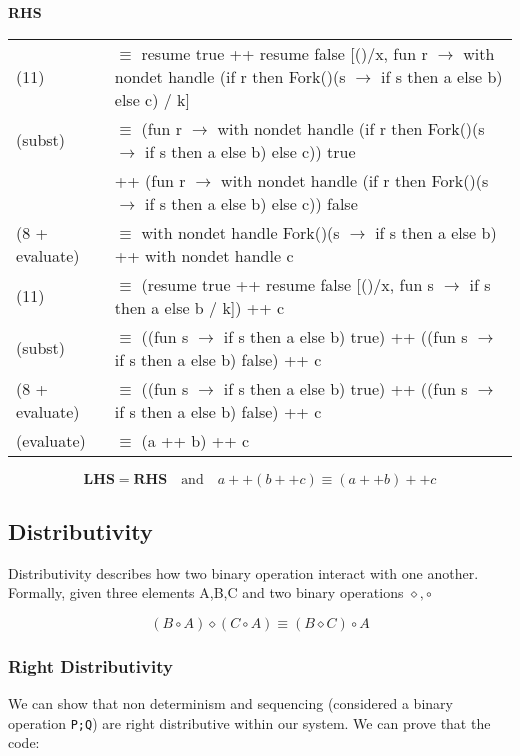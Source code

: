 \documentclass[logo,bsc,singlespacing,parskip]{infthesis}
\begin{document}
\noindent\textbf{RHS}

\begin{flushleft}
\renewcommand{\arraystretch}{1.3} %
\begin{tabularx}{\textwidth}{l X}
    (11) & $\equiv$ resume true ++ resume false [()/x, fun r $\rightarrow$ with nondet handle (if r then Fork()(s $\rightarrow$ if s then a else b) else c) / k] \\
    (subst) & $\equiv$ (fun r $\rightarrow$ with nondet handle (if r then Fork()(s $\rightarrow$ if s then a else b) else c)) true \\
            & \quad ++ (fun r $\rightarrow$ with nondet handle (if r then Fork()(s $\rightarrow$ if s then a else b) else c)) false \\
    (8 + evaluate) & $\equiv$ with nondet handle Fork()(s $\rightarrow$ if s then a else b) ++ with nondet handle c \\
    (11) & $\equiv$ (resume true ++ resume false [()/x, fun s $\rightarrow$ if s then a else b / k]) ++ c \\
    (subst) & $\equiv$ ((fun s $\rightarrow$ if s then a else b) true) ++ ((fun s $\rightarrow$ if s then a else b) false) ++ c \\
    (8 + evaluate) & $\equiv$ ((fun s $\rightarrow$ if s then a else b) true) ++ ((fun s $\rightarrow$ if s then a else b) false) ++ c \\
    (evaluate) & $\equiv$ (a ++ b) ++ c
\end{tabularx}
\end{flushleft}

\[
\textbf{LHS} = \textbf{RHS} \quad \text{and} \quad a ++ (b ++ c) \equiv (a ++ b) ++ c
\]


\subsection*{Distributivity}
Distributivity describes how two binary operation interact with one another. Formally, given three elements A,B,C and two binary operations $\diamond, \circ $

\[
(B \circ A) \diamond (C \circ A)  \equiv (B \diamond C) \circ A
\]

\subsubsection*{Right Distributivity}
We can show that non determinism and sequencing (considered a binary operation \texttt{P;Q}) are right distributive within our system. 
We can prove that the code:
\end{document}
